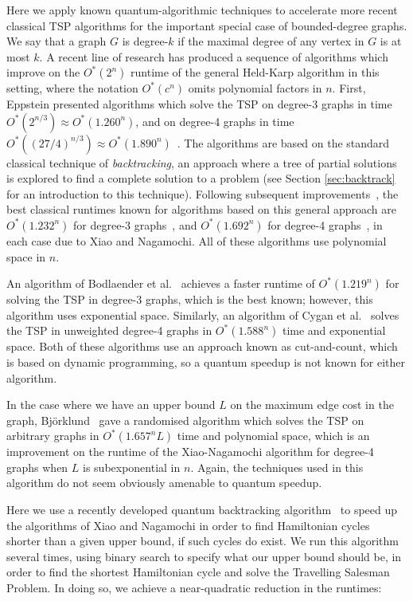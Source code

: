 Here we apply known quantum-algorithmic techniques to accelerate more recent classical TSP algorithms for the important special case of bounded-degree graphs. We say that a graph $G$ is degree-$k$ if the maximal degree of any vertex in $G$ is at most $k$. A recent line of research has produced a sequence of algorithms which improve on the $O^*(2^n)$ runtime of the general Held-Karp algorithm in this setting, where the notation $O^*(c^n)$ omits polynomial factors in $n$. First, Eppstein presented algorithms which solve the TSP on degree-3 graphs in time $O^*(2^{n/3}) \approx O^*(1.260^n)$, and on degree-4 graphs in time $O^*((27/4)^{n/3}) \approx O^*(1.890^n)$~\cite{eppstein2007}. The algorithms are based on the standard classical technique of {\em backtracking}, an approach where a tree of partial solutions is explored to find a complete solution to a problem (see Section \ref{sec:backtrack} for an introduction to this technique). Following subsequent improvements~\cite{iwama2007,liskiewicz14}, the best classical runtimes known for algorithms based on this general approach are $O^*(1.232^n)$ for degree-3 graphs~\cite{xiao2016degree3}, and $O^*(1.692^n)$ for degree-4 graphs~\cite{xiao2016degree4}, in each case due to Xiao and Nagamochi. All of these algorithms use polynomial space in $n$.

An algorithm of Bodlaender et al.~\cite{bodlaender15} achieves a faster runtime of $O^*(1.219^n)$ for solving the TSP in degree-3 graphs, which is the best known; however, this algorithm uses exponential space. Similarly, an algorithm of Cygan et al.~\cite{cygan11} solves the TSP in unweighted degree-4 graphs in $O^*(1.588^n)$ time and exponential space. Both of these algorithms use an approach known as cut-and-count, which is based on dynamic programming, so a quantum speedup is not known for either algorithm.

In the case where we have an upper bound $L$ on the maximum edge cost in the graph, Bj\"orklund~\cite{bjorklund14} gave a randomised algorithm which solves the TSP on arbitrary graphs in $O^*(1.657^n L)$ time and polynomial space, which is an improvement on the runtime of the Xiao-Nagamochi algorithm for degree-4 graphs when $L$ is subexponential in $n$. Again, the techniques used in this algorithm do not seem obviously amenable to quantum speedup.

Here we use a recently developed quantum backtracking algorithm~\cite{montanaro2015} to speed up the algorithms of Xiao and Nagamochi in order to find Hamiltonian cycles shorter than a given upper bound, if such cycles do exist. We run this algorithm several times, using binary search to specify what our upper bound should be, in order to find the shortest Hamiltonian cycle and solve the Travelling Salesman Problem. In doing so, we achieve a near-quadratic reduction in the runtimes:

